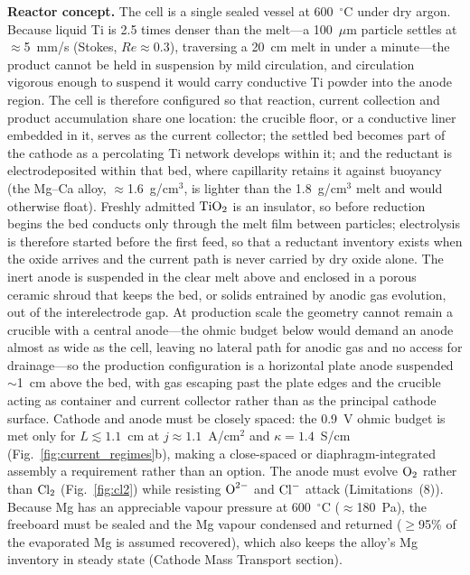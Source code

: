 \documentclass[pdflatex,sn-basic,Numbered]{sn-jnl}
\begin{document}
\textbf{Reactor concept.} The cell is a single sealed vessel at 600~$^{\circ}$C under dry argon. Because liquid Ti is 2.5 times denser than the melt---a 100~$\mu$m particle settles at $\approx$5~mm/s (Stokes, $Re \approx 0.3$), traversing a 20~cm melt in under a minute---the product cannot be held in suspension by mild circulation, and circulation vigorous enough to suspend it would carry conductive Ti powder into the anode region. The cell is therefore configured so that reaction, current collection and product accumulation share one location: the crucible floor, or a conductive liner embedded in it, serves as the current collector; the settled bed becomes part of the cathode as a percolating Ti network develops within it; and the reductant is electrodeposited within that bed, where capillarity retains it against buoyancy (the Mg--Ca alloy, $\approx$1.6~g/cm$^3$, is lighter than the 1.8~g/cm$^3$ melt and would otherwise float). Freshly admitted $\ce{TiO2}$ is an insulator, so before reduction begins the bed conducts only through the melt film between particles; electrolysis is therefore started before the first feed, so that a reductant inventory exists when the oxide arrives and the current path is never carried by dry oxide alone. The inert anode is suspended in the clear melt above and enclosed in a porous ceramic shroud that keeps the bed, or solids entrained by anodic gas evolution, out of the interelectrode gap. At production scale the geometry cannot remain a crucible with a central anode---the ohmic budget below would demand an anode almost as wide as the cell, leaving no lateral path for anodic gas and no access for drainage---so the production configuration is a horizontal plate anode suspended $\sim$1~cm above the bed, with gas escaping past the plate edges and the crucible acting as container and current collector rather than as the principal cathode surface. Cathode and anode must be closely spaced: the 0.9~V ohmic budget is met only for $L \lesssim 1.1$~cm at $j \approx 1.1$~A/cm$^2$ and $\kappa = 1.4$~S/cm (Fig.~\ref{fig:current_regimes}b), making a close-spaced or diaphragm-integrated assembly a requirement rather than an option. The anode must evolve $\ce{O2}$ rather than $\ce{Cl2}$ (Fig.~\ref{fig:cl2}) while resisting $\ce{O^{2-}}$ and $\ce{Cl^-}$ attack (Limitations~(8)). Because Mg has an appreciable vapour pressure at 600~$^{\circ}$C ($\approx$180~Pa), the freeboard must be sealed and the Mg vapour condensed and returned ($\geq$95\% of the evaporated Mg is assumed recovered), which also keeps the alloy's Mg inventory in steady state (Cathode Mass Transport section).
\end{document}
